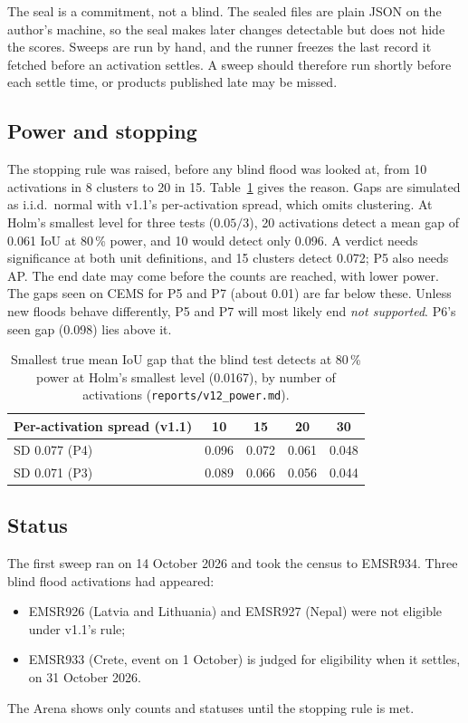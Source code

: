 \documentclass[10pt,twocolumn,a4paper]{article}
\newcommand{\file}[1]{\nolinkurl{#1}}
\newcommand{\pp}{\,\%}
\begin{document}
The seal is a commitment, not a blind. The sealed files are plain JSON on the author's machine, so the seal makes
later changes detectable but does not hide the scores. Sweeps are run by hand, and the runner freezes the last record
it fetched before an activation settles. A sweep should therefore run shortly before each settle time, or products
published late may be missed.

\subsection{Power and stopping}
The stopping rule was raised, before any blind flood was looked at, from 10 activations in 8 clusters to 20 in 15.
Table~\ref{tab:power} gives the reason. Gaps are simulated as i.i.d.\ normal with v1.1's per-activation spread, which
omits clustering. At Holm's smallest level for three tests ($0.05/3$), 20 activations detect a mean gap of 0.061 IoU
at 80\pp{} power, and 10 would detect only 0.096. A verdict needs significance at both unit definitions, and 15
clusters detect 0.072; P5 also needs AP. The end date may come before the counts are reached, with lower power.
The gaps seen on CEMS for P5 and P7 (about 0.01) are far below these.
Unless new floods behave differently, P5 and P7 will most likely end \emph{not supported}. P6's seen gap (0.098) lies
above it.

\begin{table}[t]
\centering\small
\caption{Smallest true mean IoU gap that the blind test detects at 80\pp{} power at Holm's smallest level (0.0167), by
number of activations (\file{reports/v12_power.md}).}
\label{tab:power}
\setlength{\tabcolsep}{4pt}
\begin{tabular}{@{}l c c c c@{}}
\toprule
Per-activation spread (v1.1) & 10 & 15 & 20 & 30 \\
\midrule
SD 0.077 (P4) & 0.096 & 0.072 & 0.061 & 0.048 \\
SD 0.071 (P3) & 0.089 & 0.066 & 0.056 & 0.044 \\
\bottomrule
\end{tabular}
\end{table}

\subsection{Status}
The first sweep ran on 14 October 2026 and took the census to EMSR934. Three blind flood activations had appeared:
\begin{itemize}
  \item EMSR926 (Latvia and Lithuania) and EMSR927 (Nepal) were not eligible under v1.1's rule;
  \item EMSR933 (Crete, event on 1 October) is judged for eligibility when it settles, on 31 October 2026.
\end{itemize}
The Arena shows only counts and statuses until the stopping rule is met.
\end{document}

